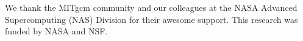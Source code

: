\documentclass[grl]{agutex2015}
\begin{document}
\begin{article}
%
%




%

\begin{acknowledgments}
We thank the MITgcm community and our colleagues at the NASA Advanced
Supercomputing (NAS) Division for their awesome support.
This research was funded by NASA and NSF.
\end{acknowledgments}








\end{article}
\end{document}
